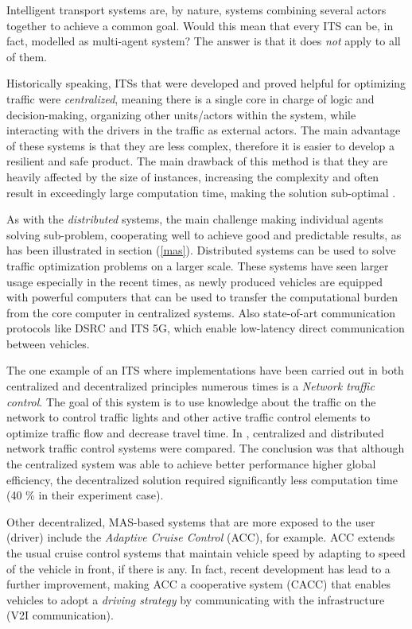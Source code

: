 \documentclass[main.tex]{subfiles}
\begin{document}
Intelligent transport systems are, by nature, systems combining several actors together to achieve a common goal. 
Would this mean that every ITS can be, in fact, modelled as multi-agent system? The answer is
that it does \emph{not} apply to all of them. 

Historically speaking, ITSs that were
developed and proved helpful for optimizing traffic were \emph{centralized}, meaning there is a
single core in charge of logic and decision-making, organizing other units/actors within the
system, while interacting with the drivers in the traffic as external actors. The main
advantage of these systems is that they are less complex, therefore it is easier to develop a resilient and
safe product. The main drawback of this method is that they are heavily affected by the size
of instances, increasing the complexity and often result in exceedingly large computation time,
making the solution sub-optimal \cite{Corman2010}. 

As with the \emph{distributed} systems, the main challenge making individual agents 
solving sub-problem, cooperating well to achieve good and predictable results, as has been 
illustrated in section (\ref{mas}). Distributed systems can be used to solve traffic optimization
problems on a larger scale. These systems have seen larger usage especially in the
recent times, as newly produced vehicles are equipped with powerful computers that can be used
to transfer the computational burden from the core computer in centralized systems. Also
state-of-art communication protocols like DSRC and ITS 5G, which enable low-latency direct
communication between vehicles. 

The one example of an ITS where implementations have been carried out in both centralized and 
decentralized principles numerous times is a \emph{Network traffic control}. The goal of this 
system is to use knowledge about the traffic on the network to control traffic lights and other 
active traffic control elements to optimize traffic flow and decrease travel time. In \cite{Chow2019}, 
centralized and distributed network traffic control systems were compared. The conclusion was that 
although the centralized system was able to achieve better performance higher global efficiency, 
the decentralized solution required significantly less computation time (40 \% in their experiment case).

Other decentralized, MAS-based systems that are more exposed to the user (driver) include the 
\emph{Adaptive Cruise Control} (ACC), for example. ACC extends the usual cruise control systems 
that maintain vehicle speed by adapting to speed of the vehicle in front, if there is any. In fact, 
recent development has lead to a further improvement, making ACC a cooperative system (CACC) that 
enables vehicles to adopt a \emph{driving strategy} by communicating with the infrastructure (V2I 
communication).
\end{document}
